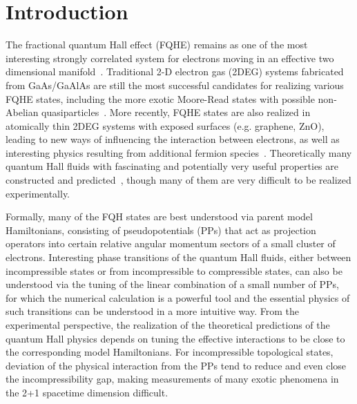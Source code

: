 \documentclass[twocolumn,showpacs,amsmath,amstex,amssymb,mathfonts,prb]{revtex4-1}
\begin{document}
\section{Introduction}
The fractional quantum Hall effect (FQHE) remains as one of the most interesting strongly correlated system for electrons moving in an effective two dimensional manifold~\cite{tsui,prange}. Traditional 2-D electron gas (2DEG) systems fabricated from GaAs/GaAlAs are still the most successful candidates for realizing various FQHE states, including the more exotic Moore-Read states with possible non-Abelian quasiparticles~\cite{MR, Wilczek91, RR}. More recently, FQHE states are also realized in atomically thin 2DEG systems with exposed surfaces (e.g. graphene, ZnO), leading to new ways of influencing the interaction between electrons, as well as interesting physics resulting from additional fermion species~\cite{Kimnature09, Andreinature09}. Theoretically many quantum Hall fluids with fascinating and potentially very useful properties are constructed and predicted~\cite{laughlin,kivelson,simon,lee}, though many of them are very difficult to be realized experimentally. 

Formally, many of the FQH states are best understood via parent model Hamiltonians, consisting of pseudopotentials (PPs) that act as projection operators into certain relative angular momentum sectors of a small cluster of electrons\cite{laughlin,MR,RR}. Interesting phase transitions of the quantum Hall fluids, either between incompressible states or from incompressible to compressible states, can also be understood via the tuning of the linear combination of a small number of PPs, for which the numerical calculation is a powerful tool and the essential physics of such transitions can be understood in a more intuitive way\cite{zlatko,yang1,zhu2017}. From the experimental perspective, the realization of the theoretical predictions of the quantum Hall physics depends on tuning the effective interactions to be close to the corresponding model Hamiltonians. For incompressible topological states, deviation of the physical interaction from the PPs tend to reduce and even close the incompressibility gap, making measurements of many exotic phenomena in the 2+1 spacetime dimension difficult\cite{MR,RR,wen92,haldane08,sarma08}.
\end{document}
